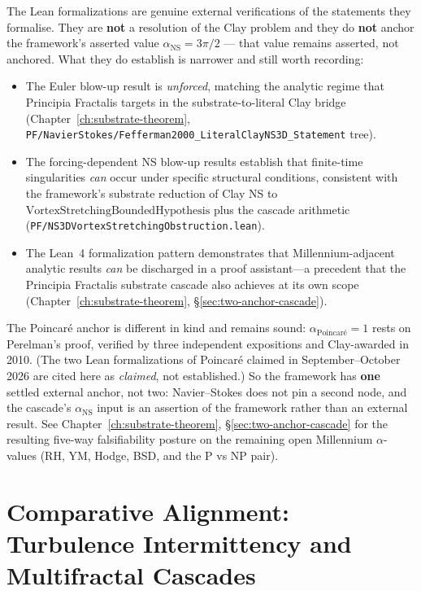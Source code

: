 The Lean formalizations are genuine external verifications of the statements
they formalise. They are \textbf{not} a resolution of the Clay problem and they
do \textbf{not} anchor the framework's asserted value
$\alpha_{\text{NS}} = 3\pi/2$ --- that value remains asserted, not anchored.
What they do establish is narrower and still worth recording:
\begin{itemize}
\item The Euler blow-up result is \emph{unforced}, matching the analytic
regime that Principia Fractalis targets in the substrate-to-literal Clay
bridge (Chapter~\ref{ch:substrate-theorem},
\texttt{PF/NavierStokes/Fefferman2000\_LiteralClayNS3D\_Statement} tree).
\item The forcing-dependent NS blow-up results establish that
finite-time singularities \emph{can} occur under specific structural
conditions, consistent with the framework's substrate reduction of Clay
NS to $\text{VortexStretchingBoundedHypothesis}$ plus the cascade
arithmetic (\texttt{PF/NS3DVortexStretchingObstruction.lean}).
\item The Lean~4 formalization pattern demonstrates that
Millennium-adjacent analytic results \emph{can} be discharged in a
proof assistant---a precedent that the Principia Fractalis substrate
cascade also achieves at its own scope
(Chapter~\ref{ch:substrate-theorem}, \S\ref{sec:two-anchor-cascade}).
\end{itemize}

The Poincar\'e anchor is different in kind and remains sound:
$\alpha_{\text{Poincar\'e}} = 1$ rests on Perelman's proof, verified by three
independent expositions and Clay-awarded in 2010. (The two Lean formalizations
of Poincar\'e claimed in September--October 2026 are cited here as
\emph{claimed}, not established.) So the framework has
\textbf{one} settled external anchor, not two: Navier--Stokes does not pin a
second node, and the cascade's $\alpha_{\text{NS}}$ input is an assertion of
the framework rather than an external result. See Chapter~\ref{ch:substrate-theorem},
\S\ref{sec:two-anchor-cascade} for the resulting five-way
falsifiability posture on the remaining open Millennium
$\alpha$-values (RH, YM, Hodge, BSD, and the P vs NP pair).

\section[Comparative Alignment: Multifractal Cascades]{Comparative Alignment:\\Turbulence Intermittency and Multifractal Cascades}

